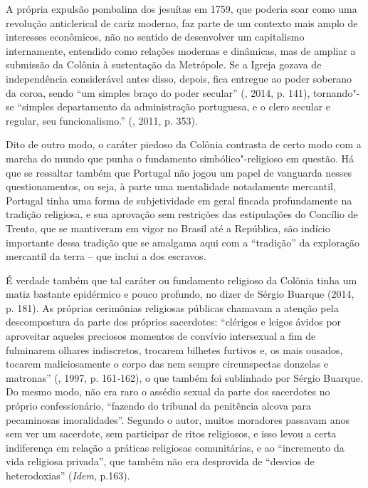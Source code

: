 A própria expulsão pombalina dos jesuítas em 1759, que poderia soar como
uma revolução anticlerical de cariz moderno, faz parte de um contexto
mais amplo de interesses econômicos, não no sentido de desenvolver um
capitalismo internamente, entendido como relações modernas e dinâmicas,
mas de ampliar a submissão da Colônia à sustentação da Metrópole. Se a
Igreja gozava de independência considerável antes disso, depois, fica
entregue ao poder soberano da coroa, sendo ``um simples braço do poder
secular'' (, 2014, p. 141), tornando"-se ``simples departamento da
administração portuguesa, e o clero secular e regular, seu
funcionalismo.'' (, 2011, p. 353).

Dito de outro modo, o caráter piedoso da Colônia contrasta de certo modo
com a marcha do mundo que punha o fundamento simbólico"-religioso em
questão. Há que se ressaltar também que Portugal não jogou um papel de
vanguarda nesses questionamentos, ou seja, à parte uma mentalidade
notadamente mercantil, Portugal tinha uma forma de subjetividade em
geral fincada profundamente na tradição religiosa, e sua aprovação sem
restrições das estipulações do Concílio de Trento, que se mantiveram em
vigor no Brasil até a República, são indício
importante dessa tradição que se amalgama aqui com a ``tradição'' da
exploração mercantil da terra -- que inclui a dos escravos.

É verdade também que tal caráter ou fundamento religioso da Colônia
tinha um matiz bastante epidérmico e pouco profundo, no dizer de Sérgio
Buarque (2014, p. 181). As próprias cerimônias religiosas públicas
chamavam a atenção pela descompostura da parte dos próprios sacerdotes:
``clérigos e leigos ávidos por aproveitar aqueles preciosos momentos de
convívio intersexual a fim de fulminarem olhares indiscretos, trocarem
bilhetes furtivos e, os mais ousados, tocarem maliciosamente o corpo das
nem sempre circunspectas donzelas e matronas'' (, 1997, p.
161\emph{-}162), o que também foi sublinhado por Sérgio Buarque.
Do mesmo modo, não era raro o assédio sexual da parte dos sacerdotes no
próprio confessionário, ``fazendo do tribunal da penitência alcova para
pecaminosas imoralidades''. Segundo o autor, muitos moradores passavam
anos sem ver um sacerdote, sem participar de ritos religiosos, e isso
levou a certa indiferença em relação a práticas religiosas comunitárias,
e ao ``incremento da vida religiosa privada'', que também não era
desprovida de ``desvios de heterodoxias'' (\emph{Idem}, p.163).

